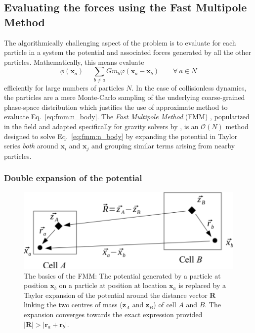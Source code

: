 \subsection{Evaluating the forces using the Fast Multipole Method}
\label{ssec:fmm_summary}

The algorithmically challenging aspect of the \nbody problem is to
evaluate for each particle in a system the potential and associated
forces generated by all the other particles. Mathematically, this means
evaluate
\begin{equation}
  \phi(\mathbf{x}_a) = \sum_{b \neq a} G m_b\varphi(\mathbf{x}_a -
  \mathbf{x}_b)\qquad \forall~a\in N
  \label{eq:fmm:n_body}
\end{equation}
efficiently for large numbers of particles $N$. In the case of
collisionless dynamics, the particles are a mere Monte-Carlo sampling
of the underlying coarse-grained phase-space distribution which
justifies the use of approximate method to evaluate
Eq.~\ref{eq:fmm:n_body}. The \emph{Fast Multipole Method} (FMM)
\citep{Greengard1987, Cheng1999}, popularized in the field and adapted
specifically for gravity solvers by \cite{Dehnen2000, Dehnen2002}, is
an $\mathcal{O}(N)$ method designed to solve Eq.~\ref{eq:fmm:n_body}
by expanding the potential in Taylor series \emph{both} around
$\mathbf{x}_i$ and $\mathbf{x}_j$ and grouping similar terms
arising from nearby particles. \\

\subsubsection{Double expansion of the potential}

\begin{figure}
\includegraphics[width=\columnwidth]{cells.pdf}
\caption{The basics of the FMM: The potential generated by a particle
  at position $\mathbf{x}_b$ on a particle at position at location
  $\mathbf{x}_a$ is replaced by a Taylor expansion of the potential
  around the distance vector $\mathbf{R}$ linking the two centres of mass
  ($\mathbf{z}_A$ and $\mathbf{z}_B$) of cell $A$ and $B$. The
  expansion converges towards the exact expression provided
  $|\mathbf{R}|>|\mathbf{r}_a + \mathbf{r}_b|$.}
\label{fig:fmm:cells}
\end{figure}

